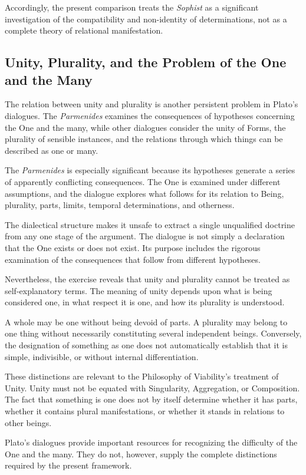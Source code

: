 Accordingly, the present comparison treats the \textit{Sophist} as a
significant investigation of the compatibility and non-identity of
determinations, not as a complete theory of relational manifestation.

\subsection{Unity, Plurality, and the Problem of the One and the Many}

The relation between unity and plurality is another persistent problem
in Plato's dialogues. The \textit{Parmenides} examines the consequences
of hypotheses concerning the One and the many, while other dialogues
consider the unity of Forms, the plurality of sensible instances, and
the relations through which things can be described as one or many.

The \textit{Parmenides} is especially significant because its
hypotheses generate a series of apparently conflicting consequences.
The One is examined under different assumptions, and the dialogue
explores what follows for its relation to Being, plurality, parts,
limits, temporal determinations, and otherness.

The dialectical structure makes it unsafe to extract a single
unqualified doctrine from any one stage of the argument. The dialogue
is not simply a declaration that the One exists or does not exist.
Its purpose includes the rigorous examination of the consequences
that follow from different hypotheses.

Nevertheless, the exercise reveals that unity and plurality cannot
be treated as self-explanatory terms. The meaning of unity depends
upon what is being considered one, in what respect it is one, and
how its plurality is understood.

A whole may be one without being devoid of parts. A plurality may
belong to one thing without necessarily constituting several
independent beings. Conversely, the designation of something as one
does not automatically establish that it is simple, indivisible, or
without internal differentiation.

These distinctions are relevant to the Philosophy of Viability's
treatment of Unity. Unity must not be equated with Singularity,
Aggregation, or Composition. The fact that something is one does
not by itself determine whether it has parts, whether it contains
plural manifestations, or whether it stands in relations to other
beings.

Plato's dialogues provide important resources for recognizing the
difficulty of the One and the many. They do not, however, supply
the complete distinctions required by the present framework.

